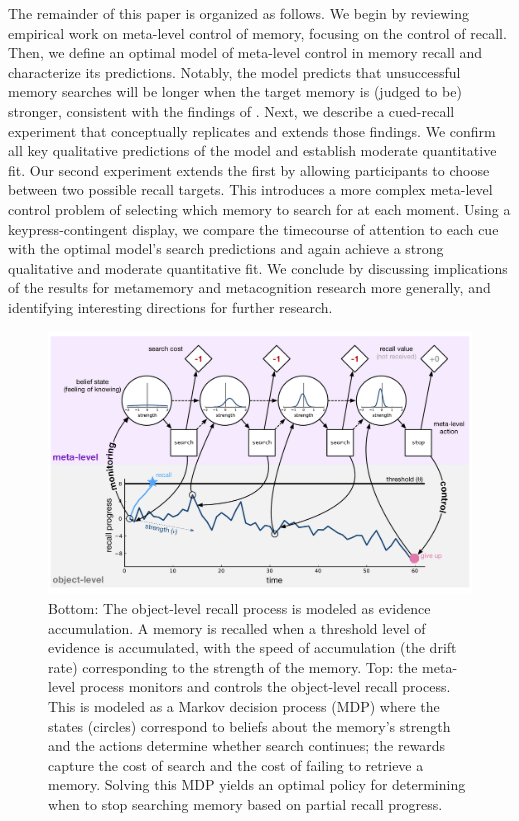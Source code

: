 The remainder of this paper is organized as follows. We begin by reviewing empirical work on meta-level control of memory, focusing on the control of recall. Then, we define an optimal model of meta-level control in memory recall and characterize its predictions. Notably, the model predicts that unsuccessful memory searches will be longer when the target memory is (judged to be) stronger, consistent with the findings of \citet{costermans1992confidence}. Next, we describe a cued-recall experiment that conceptually replicates and extends those findings. We confirm all key qualitative predictions of the model and establish moderate quantitative fit. Our second experiment extends the first by allowing participants to choose between two possible recall targets. This introduces a more complex meta-level control problem of selecting which memory to search for at each moment. Using a keypress-contingent display, we compare the timecourse of attention to each cue with the optimal model's search predictions and again achieve a strong qualitative and moderate quantitative fit. We conclude by discussing implications of the results for metamemory and metacognition research more generally, and identifying interesting directions for further research.


\begin{figure}[t!]
  \centering
  \includegraphics[width=\textwidth]{figs/memory/model.pdf}
  \caption{
    Bottom: The object-level recall process is modeled as evidence accumulation. A memory is recalled when a threshold level of evidence is accumulated, with the speed of accumulation (the drift rate) corresponding to the strength of the memory. Top: the meta-level process monitors and controls the object-level recall process. This is modeled as a Markov decision process (MDP) where the states (circles) correspond to beliefs about the memory's strength and the actions determine whether search continues; the rewards capture the cost of search and the cost of failing to retrieve a memory. Solving this MDP yields an optimal policy for determining when to stop searching memory based on partial recall progress.}
  \label{fig:model-diagram}
\end{figure}

